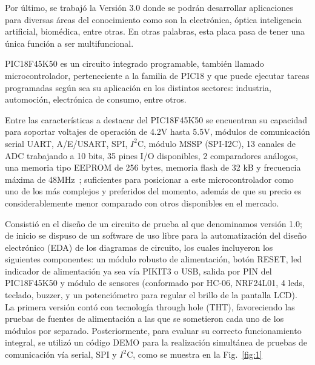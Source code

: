 \documentclass[times, 10pt,twocolumn]{article}
\begin{document}
Por último, se trabajó la Versión 3.0 donde se podrán desarrollar aplicaciones para diversas áreas del conocimiento como son la electrónica, óptica inteligencia artificial, biomédica, entre otras. En otras palabras, esta placa pasa de tener una única función a ser multifuncional.



PIC18F45K50 es un circuito integrado programable, también llamado microcontrolador, perteneciente a la familia de PIC18 y que puede ejecutar tareas programadas según sea su aplicación en los distintos sectores: industria, automoción, electrónica de consumo, entre otros.

Entre las características a destacar del PIC18F45K50 se encuentran su capacidad para soportar voltajes de operación de 4.2V hasta 5.5V, módulos de comunicación serial UART, A/E/USART, SPI, $I^{2}$C, módulo MSSP (SPI-I2C), 13 canales de ADC trabajando a 10 bits, 35 pines I/O disponibles, 2 comparadores análogos, una memoria tipo EEPROM de 256 bytes, memoria flash de 32 kB y frecuencia máxima de 48MHz~\cite{ex1}; suficientes para posicionar a este microcontrolador como uno de los más complejos y preferidos del momento, además de que su precio es considerablemente menor comparado con otros disponibles en el mercado.



Consistió en el diseño de un circuito de prueba al que denominamos versión 1.0; de inicio se dispuso de un software de uso libre para la automatización del diseño electrónico (EDA) de los diagramas de circuito, los cuales incluyeron los siguientes componentes: un módulo robusto de alimentación, botón RESET, led indicador de alimentación ya sea vía PIKIT3 o USB, salida por PIN del PIC18F45K50 y módulo de sensores (conformado por HC-06, NRF24L01, 4 leds, teclado, buzzer, y un potenciómetro para regular el brillo de la pantalla LCD). \\

La primera versión contó con tecnología through hole (THT), favoreciendo las pruebas de fuentes de alimentación a las que se sometieron cada uno de los módulos por separado. Posteriormente, para evaluar su correcto funcionamiento integral, se utilizó un
código DEMO para la realización simultánea de pruebas de comunicación vía serial, SPI y $I^{2}$C, como se muestra en la Fig.~\ref{fig:1}\\
\end{document}
